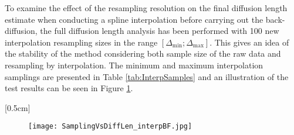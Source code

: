 \documentclass[../../CompleteThesis2/Complete_2ndDraft]{subfiles}
\begin{document}
To examine the effect of the resampling resolution on the final diffusion length estimate when conducting a spline interpolation before carrying out the back-diffusion, the full diffusion length analysis has been performed with 100 new interpolation resampling sizes in the range $[\Delta_{\text{min}};\Delta_{\text{max}}]$. This gives an idea of the stability of the method considering both sample size of the raw data and resampling by interpolation. The minimum and maximum interpolation samplings are presented in Table \ref{tab:InterpSamples} and an illustration of the test results can be seen in Figure \ref{Fig:COMPMETH_SamplingVsDiffLen_interpBF}.

[0.5cm]%


\begin{figure}[h]
	\centering
	\texttt{[image: SamplingVsDiffLen\_interpBF.jpg]}
	\caption{}
	\label{Fig:COMPMETH_SamplingVsDiffLen_interpBF}
\end{figure}

\end{document}
